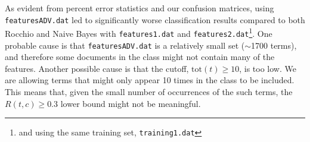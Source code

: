 \documentclass[11pt]{article}
\begin{document}
As evident from percent error statistics and our confusion matrices, using \texttt{featuresADV.dat} led to significantly
worse classification results compared to both Rocchio and Naive Bayes with \texttt{features1.dat} and
\texttt{features2.dat}\footnote{and using the same training set, \texttt{training1.dat}}. One probable cause is that \texttt{featuresADV.dat} is a
relatively small set ($\sim$1700 terms), and therefore some documents in the class might not contain many
of the features. Another possible cause is that the cutoff, $\text{tot}(t) \geq 10$, is too low. We are
allowing terms that might only appear 10 times in the class to be included. This means that, given the small
number of occurrences of the such terms, the $R(t, c) \geq 0.3$ lower bound might not be meaningful.
\end{document}
